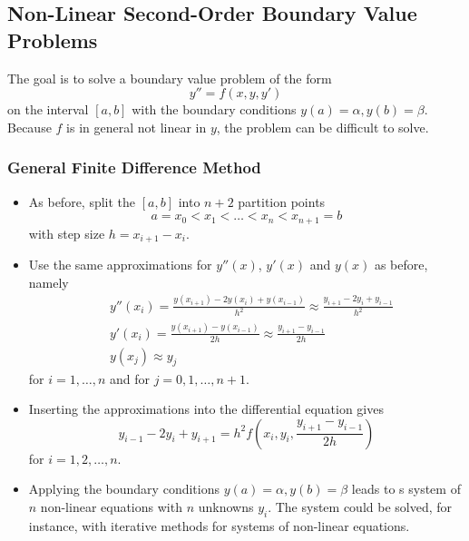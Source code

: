 \documentclass[11pt, a4paper]{article}
\begin{document}
\subsection{Non-Linear Second-Order Boundary Value Problems}
The goal is to solve a boundary value problem of the form
\begin{equation*}
	y'' = f(x, y, y')
\end{equation*}
on the interval $ [a, b] $ with the boundary conditions $ y(a) = \alpha, y(b) = \beta $. Because $ f $ is in general not linear in $ y $, the problem can be difficult to solve.

\subsubsection{General Finite Difference Method}
\begin{itemize}
	\item As before, split the $ [a, b] $ into $ n+2 $ partition points
	\begin{equation*}
		a = x_0 < x_1 < \dots < x_{n} < x_{n+1} = b
	\end{equation*}
	with step size $ h = x_{i+1} - x_{i}$.
	
	\item Use the same approximations for $ y''(x) $, $ y'(x) $ and $ y (x)$ as before, namely
	\begin{align*}
		&y''(x_{i}) = \frac{y(x_{i+1}) - 2y(x_{i}) + y(x_{i-1})}{h^{2}} \approx \frac{y_{i+1} - 2y_{i} + y_{i-1}}{h^{2}} \\
		&y'(x_{i}) = \frac{y(x_{i+1})-y(x_{i-1})}{2h} \approx  \frac{y_{i+1}-y_{i-1}}{2h}\\
		&y(x_{j}) \approx y_{j}
	\end{align*}
	for $ i = 1, \ldots, n $ and for $ j = 0, 1, \ldots, n+1 $.
	
	\item Inserting the approximations into the differential equation gives
	\begin{equation*}
		y_{i-1} - 2y_{i} + y_{i+1} = h^{2} f\left(x_{i}, y_{i}, \frac{y_{i+1} - y_{i-1}}{2h}\right)
	\end{equation*}
	for $ i = 1, 2, \ldots, n $.  
	
	\item Applying the boundary conditions $ y(a) = \alpha, y(b) = \beta $ leads to s system of $ n $ non-linear equations with $ n $ unknowns $ y_{i} $. The system could be solved, for instance, with iterative methods for systems of non-linear equations.
	
\end{itemize}
\end{document}
